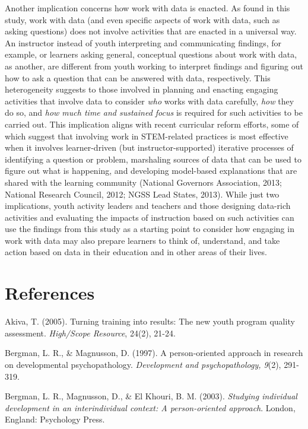 \documentclass[]{msu-thesis}
\theoremstyle{definition}
\theoremstyle{definition}
\theoremstyle{definition}
\theoremstyle{remark}
\begin{document}
Another implication concerns how work with data is enacted. As found in
this study, work with data (and even specific aspects of work with data,
such as asking questions) does not involve activities that are enacted
in a universal way. An instructor instead of youth interpreting and
communicating findings, for example, or learners asking general,
conceptual questions about work with data, as another, are different
from youth working to interpret findings and figuring out how to ask a
question that can be answered with data, respectively. This
heterogeneity suggests to those involved in planning and enacting
engaging activities that involve data to consider \emph{who} works with
data carefully, \emph{how} they do so, and \emph{how much time and
sustained focus} is required for such activities to be carried out. This
implication aligns with recent curricular reform efforts, some of which
suggest that involving work in STEM-related practices is most effective
when it involves learner-driven (but instructor-supported) iterative
processes of identifying a question or problem, marshaling sources of
data that can be used to figure out what is happening, and developing
model-based explanations that are shared with the learning community
(National Governors Association, 2013; National Research Council, 2012;
NGSS Lead States, 2013). While just two implications, youth activity
leaders and teachers and those designing data-rich activities and
evaluating the impacts of instruction based on such activities can use
the findings from this study as a starting point to consider how
engaging in work with data may also prepare learners to think of,
understand, and take action based on data in their education and in
other areas of their lives.

\chapter{References}\label{references}

\setlength{\parindent}{-0.2in} \setlength{\leftskip}{0.2in}
\setlength{\parskip}{8pt} \noindent

Akiva, T. (2005). Turning training into results: The new youth program
quality assessment. \emph{High/Scope Resource}, 24(2), 21-24.

Bergman, L. R., \& Magnusson, D. (1997). A person-oriented approach in
research on developmental psychopathology. \emph{Development and
psychopathology, 9}(2), 291-319.

Bergman, L. R., Magnusson, D., \& El Khouri, B. M. (2003).
\emph{Studying individual development in an interindividual context: A
person-oriented approach}. London, England: Psychology Press.
\end{document}
